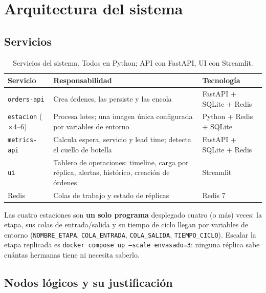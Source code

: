 \documentclass[12pt,a4paper]{article}
\begin{document}
\section{Arquitectura del sistema}

\subsection{Servicios}

\begin{table}[H]
\centering
\caption{Servicios del sistema. Todos en Python; API con FastAPI, UI con Streamlit.}
\small
\begin{tabular}{L{3.2cm} L{6.8cm} L{3.6cm}}
\toprule
\textbf{Servicio} & \textbf{Responsabilidad} & \textbf{Tecnología} \\
\midrule
\texttt{orders-api} & Crea órdenes, las persiste y las encola & FastAPI + SQLite + Redis \\
\texttt{estacion} ($\times$4--6) & Procesa lotes; una imagen única configurada por variables de entorno & Python + Redis + SQLite \\
\texttt{metrics-api} & Calcula espera, servicio y lead time; detecta el cuello de botella & FastAPI + SQLite + Redis \\
\texttt{ui} & Tablero de operaciones: timeline, carga por réplica, alertas, histórico, creación de órdenes & Streamlit \\
Redis & Colas de trabajo y estado de réplicas & Redis 7 \\
\bottomrule
\end{tabular}
\end{table}

Las cuatro estaciones son \textbf{un solo programa} desplegado cuatro (o más)
veces: la etapa, sus colas de entrada/salida y su tiempo de ciclo llegan por
variables de entorno (\texttt{NOMBRE\_ETAPA}, \texttt{COLA\_ENTRADA},
\texttt{COLA\_SALIDA}, \texttt{TIEMPO\_CICLO}). Escalar la etapa replicada es
\texttt{docker compose up --scale envasado=3}: ninguna réplica sabe cuántas
hermanas tiene ni necesita saberlo.

\subsection{Nodos lógicos y su justificación}
\label{sec:nodos}
\end{document}
